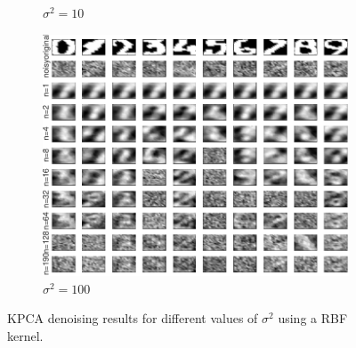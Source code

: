 \documentclass{article}
\begin{document}
\begin{figure}[h]
\begin{subfigure}[b]{0.3\textwidth}
                 \caption{$\sigma^2 = 10$}
                 \label{fig:kpca_digits_2}
             \end{subfigure}
             \hfill
             \begin{subfigure}[b]{0.3\textwidth}
                 \centering
                 \includegraphics[width=\textwidth]{Assignment 3/figures/2_1/KPCA_sigmafactor_100.00.pdf}
                 \caption{$\sigma^2 = 100$}
                 \label{fig:kpca_digits_3}
             \end{subfigure}
            \caption{KPCA denoising results for different values of $\sigma^2$ using a RBF kernel.}
        \end{figure}
        
\end{document}
